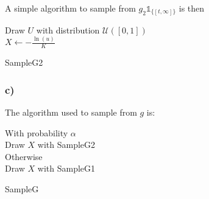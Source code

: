 A simple algorithm to sample from $g_2\mathbb{1}_{\{[t,\infty]\}}$ is then 

\begin{algorithm}[H]
	Draw $U$ with distribution $\mathcal{U}([0,1])$\\
	$X \leftarrow -\frac{\ln(u)}{K}$\\ 
	\caption{SampleG2}
\end{algorithm}
\subsubsection*{c)}

The algorithm used to sample from $g$ is:

\begin{algorithm}[H]
	With probability $\alpha$\\
	Draw $X$ with SampleG2\\
	Otherwise\\
	Draw $X$ with SampleG1\\
	\caption{SampleG}
\end{algorithm}


